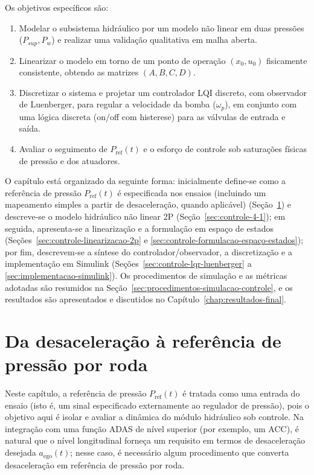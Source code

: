 Os objetivos específicos são:
\begin{enumerate}
    \item Modelar o subsistema hidráulico por um modelo não linear em duas pressões ($P_{sup},P_w$) e realizar uma validação qualitativa em malha aberta.
    \item Linearizar o modelo em torno de um ponto de operação $(x_0,u_0)$ fisicamente consistente, obtendo as matrizes $(A,B,C,D)$.
    \item Discretizar o sistema e projetar um controlador LQI discreto, com observador de Luenberger, para regular a velocidade da bomba ($\omega_p$), em conjunto com uma lógica discreta (on/off com histerese) para as válvulas de entrada e saída.
    \item Avaliar o seguimento de $P_{\mathrm{ref}}(t)$ e o esforço de controle sob saturações físicas de pressão e dos atuadores.
\end{enumerate}

O capítulo está organizado da seguinte forma: inicialmente define-se como a referência de pressão $P_{\mathrm{ref}}(t)$ é especificada nos ensaios (incluindo um mapeamento simples a partir de desaceleração, quando aplicável) (Seção~\ref{sec:mapeamento-aref-pressao}) e descreve-se o modelo hidráulico não linear 2P (Seção~\ref{sec:controle-4-1}); em seguida, apresenta-se a linearização e a formulação em espaço de estados (Seções~\ref{sec:controle-linearizacao-2p} e \ref{sec:controle-formulacao-espaço-estados}); por fim, descrevem-se a síntese do controlador/observador, a discretização e a implementação em Simulink (Seções~\ref{sec:controle-lqr-luenberger} a \ref{sec:implementacao-simulink}). Os procedimentos de simulação e as métricas adotadas são resumidos na Seção~\ref{sec:procedimentos-simulacao-controle}, e os resultados são apresentados e discutidos no Capítulo~\ref{chap:resultados-final}.


\section{Da desaceleração à referência de pressão por roda}
\label{sec:mapeamento-aref-pressao}
Neste capítulo, a referência de pressão $P_{\mathrm{ref}}(t)$ é tratada como uma entrada do ensaio (isto é, um sinal especificado externamente ao regulador de pressão), pois o objetivo aqui é isolar e avaliar a dinâmica do módulo hidráulico sob controle. Na integração com uma função ADAS de nível superior (por exemplo, um ACC), é natural que o nível longitudinal forneça um requisito em termos de desaceleração desejada $a_{\mathrm{ego}}(t)$; nesse caso, é necessário algum procedimento que converta desaceleração em referência de pressão por roda.

